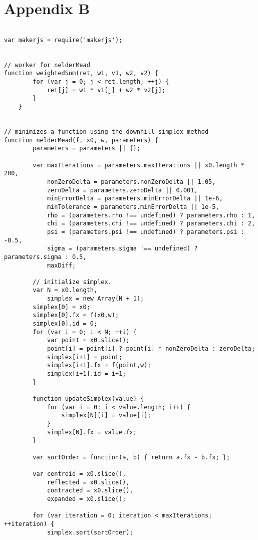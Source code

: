 \documentclass[11pt]{article}
\begin{document}
\normalsize
\newpage
\section*{Appendix B}

\tiny
\begin{lstlisting}

var makerjs = require('makerjs');


// worker for nelderMead
function weightedSum(ret, w1, v1, w2, v2) {
        for (var j = 0; j < ret.length; ++j) {
            ret[j] = w1 * v1[j] + w2 * v2[j];
        }
    }


// minimizes a function using the downhill simplex method
function nelderMead(f, x0, w, parameters) {
        parameters = parameters || {};

        var maxIterations = parameters.maxIterations || x0.length * 200,
            nonZeroDelta = parameters.nonZeroDelta || 1.05,
            zeroDelta = parameters.zeroDelta || 0.001,
            minErrorDelta = parameters.minErrorDelta || 1e-6,
            minTolerance = parameters.minErrorDelta || 1e-5,
            rho = (parameters.rho !== undefined) ? parameters.rho : 1,
            chi = (parameters.chi !== undefined) ? parameters.chi : 2,
            psi = (parameters.psi !== undefined) ? parameters.psi : -0.5,
            sigma = (parameters.sigma !== undefined) ? parameters.sigma : 0.5,
            maxDiff;

        // initialize simplex.
        var N = x0.length,
            simplex = new Array(N + 1);
        simplex[0] = x0;
        simplex[0].fx = f(x0,w);
        simplex[0].id = 0;
        for (var i = 0; i < N; ++i) {
            var point = x0.slice();
            point[i] = point[i] ? point[i] * nonZeroDelta : zeroDelta;
            simplex[i+1] = point;
            simplex[i+1].fx = f(point,w);
            simplex[i+1].id = i+1;
        }

        function updateSimplex(value) {
            for (var i = 0; i < value.length; i++) {
                simplex[N][i] = value[i];
            }
            simplex[N].fx = value.fx;
        }

        var sortOrder = function(a, b) { return a.fx - b.fx; };

        var centroid = x0.slice(),
            reflected = x0.slice(),
            contracted = x0.slice(),
            expanded = x0.slice();

        for (var iteration = 0; iteration < maxIterations; ++iteration) {
            simplex.sort(sortOrder);


\end{lstlisting}
\end{document}
